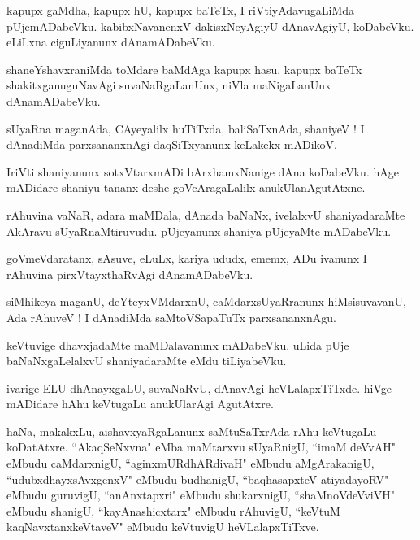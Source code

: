 \documentclass{article}
\begin{document}
\begin{mng}%
kapupx gaMdha, kapupx hU, kapupx baTeTx, I riVtiyAdavugaLiMda pUjemADabeVku. kabibxNavanenxV 
dakisxNeyAgiyU dAnavAgiyU, koDabeVku. eLiLxna ciguLiyanunx dAnamADabeVku.
\end{mng}

\begin{mng}%
shaneYshavxraniMda toMdare baMdAga kapupx hasu, kapupx baTeTx shakitxganuguNavAgi suvaNaRgaLanUnx, 
niVla maNigaLanUnx dAnamADabeVku.
\end{mng}

\begin{mng}%
sUyaRna maganAda, CAyeyalilx huTiTxda, baliSaTxnAda, shaniyeV ! I dAnadiMda parxsananxnAgi 
daqSiTxyanunx keLakekx mADikoV.
\end{mng}

\begin{mng}%
IriVti shaniyanunx sotxVtarxmADi bArxhamxNanige dAna koDabeVku. hAge mADidare shaniyu tananx deshe 
goVcAragaLalilx anukUlanAgutAtxne.
\end{mng}

\begin{mng}%
rAhuvina vaNaR, adara maMDala, dAnada baNaNx, ivelalxvU shaniyadaraMte AkAravu sUyaRnaMtiruvudu. 
pUjeyanunx shaniya pUjeyaMte mADabeVku.
\end{mng}

\begin{mng}%
goVmeVdaratanx, sAsuve, eLuLx, kariya ududx, ememx, ADu ivanunx I rAhuvina pirxVtayxthaRvAgi 
dAnamADabeVku.
\end{mng}

\begin{mng}%
siMhikeya maganU, deYteyxVMdarxnU, caMdarxsUyaRranunx hiMsisuvavanU, Ada rAhuveV ! I dAnadiMda 
saMtoVSapaTuTx parxsananxnAgu.
\end{mng}

\begin{mng}%
keVtuvige dhavxjadaMte maMDalavanunx mADabeVku. uLida pUje baNaNxgaLelalxvU shaniyadaraMte eMdu 
tiLiyabeVku.
\end{mng}

\begin{mng}%
ivarige ELU dhAnayxgaLU, suvaNaRvU, dAnavAgi heVLalapxTiTxde. hiVge mADidare hAhu keVtugaLu 
anukUlarAgi AgutAtxre.
\end{mng}

\begin{mng}%
haNa, makakxLu, aishavxyaRgaLanunx saMtuSaTxrAda rAhu keVtugaLu koDatAtxre. ``AkaqSeNxvna" eMba 
maMtarxvu sUyaRnigU, ``imaM deVvAH" eMbudu caMdarxnigU, ``aginxmURdhARdivaH" eMbudu aMgArakanigU, 
``udubxdhayxsAvxgenxV" eMbudu budhanigU, ``baqhasapxteV atiyadayoRV" eMbudu guruvigU, 
``anAnxtapxri" eMbudu shukarxnigU, ``shaMnoVdeVviVH" eMbudu shanigU, ``kayAnashicxtarx" eMbudu 
rAhuvigU, ``keVtuM kaqNavxtanxkeVtaveV" eMbudu keVtuvigU heVLalapxTiTxve.
\end{mng}
\end{document}
